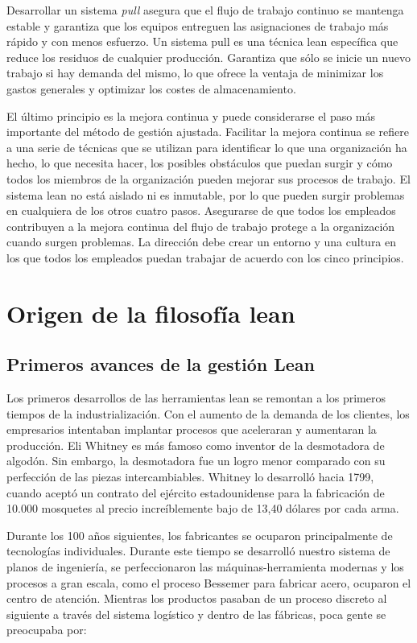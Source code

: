 Desarrollar un sistema \textit{pull} asegura que el flujo de trabajo continuo se mantenga estable y garantiza que los equipos entreguen las asignaciones de trabajo más rápido y con menos esfuerzo. Un sistema pull es una técnica lean específica que reduce los residuos de cualquier producción. Garantiza que sólo se inicie un nuevo trabajo si hay demanda del mismo, lo que ofrece la ventaja de minimizar los gastos generales y optimizar los costes de almacenamiento.

El último principio es la mejora continua y puede considerarse el paso más importante del método de gestión ajustada.
Facilitar la mejora continua se refiere a una serie de técnicas que se utilizan para identificar lo que una organización ha hecho, lo que necesita hacer, los posibles obstáculos que puedan surgir y cómo todos los miembros de la organización pueden mejorar sus procesos de trabajo.
El sistema lean no está aislado ni es inmutable, por lo que pueden surgir problemas en cualquiera de los otros cuatro pasos.
Asegurarse de que todos los empleados contribuyen a la mejora continua del flujo de trabajo protege a la organización cuando surgen problemas.
La dirección debe crear un entorno y una cultura en los que todos los empleados puedan trabajar de acuerdo con los cinco principios.

\section{Origen de la filosofía lean}

\subsection{Primeros avances de la gestión Lean}

Los primeros desarrollos de las herramientas lean se remontan a los primeros tiempos de la industrialización.
Con el aumento de la demanda de los clientes, los empresarios intentaban implantar procesos que aceleraran y aumentaran la producción.
Eli Whitney es más famoso como inventor de la desmotadora de algodón.
Sin embargo, la desmotadora fue un logro menor comparado con su perfección de las piezas intercambiables.
Whitney lo desarrolló hacia 1799, cuando aceptó un contrato del ejército estadounidense para la fabricación de 10.000 mosquetes al precio increíblemente bajo de 13,40 dólares por cada arma.

Durante los 100 años siguientes, los fabricantes se ocuparon principalmente de tecnologías individuales.
Durante este tiempo se desarrolló nuestro sistema de planos de ingeniería, se perfeccionaron las máquinas-herramienta modernas y los procesos a gran escala, como el proceso Bessemer para fabricar acero, ocuparon el centro de atención.
Mientras los productos pasaban de un proceso discreto al siguiente a través del sistema logístico y dentro de las fábricas, poca gente se preocupaba por:

